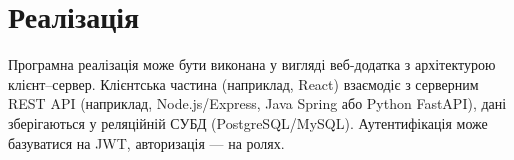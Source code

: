 \section{Реалізація}
Програмна реалізація може бути виконана у вигляді веб-додатка з архітектурою клієнт–сервер. Клієнтська частина (наприклад, React) взаємодіє з серверним REST API (наприклад, Node.js/Express, Java Spring або Python FastAPI), дані зберігаються у реляційній СУБД (PostgreSQL/MySQL). Аутентифікація може базуватися на JWT, авторизація — на ролях.
